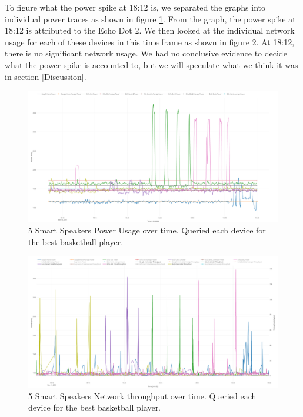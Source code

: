To figure what the power spike at 18:12 is, we separated the graphs into individual power traces as shown in figure \ref{fig:bestBballSeperate}. From the graph, the power spike at 18:12 is attributed to the Echo Dot 2. We then looked at the individual network usage for each of these devices in this time frame as shown in figure \ref{fig:bestBballNetwork}. At 18:12, there is no significant network usage. We had no conclusive evidence to decide what the power spike is accounted to, but we will speculate what we think it was in section \ref{Discussion}.

\begin{figure}[H]
  \centering
  \includegraphics[width=1\textwidth]{figures/bestBballSeperate.png}
  \caption{5 Smart Speakers Power Usage over time. Queried each device for the
  best basketball player.}
  \label{fig:bestBballSeperate}
\end{figure}

\begin{figure}[H]
  \centering
  \includegraphics[width=1\textwidth]{figures/bestBballNetwork.png}
  \caption{5 Smart Speakers Network throughput over time. Queried each device for the  best basketball player.}
  \label{fig:bestBballNetwork}
\end{figure}

